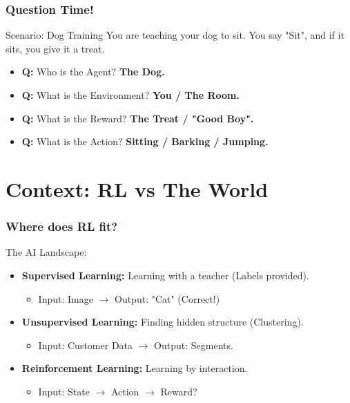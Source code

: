 \documentclass[aspectratio=169]{beamer}
\begin{document}
\begin{frame}
    \frametitle{Question Time!}
    \begin{alertblock}{Scenario: Dog Training}
        You are teaching your dog to sit. You say "Sit", and if it sits, you give it a treat.
    \end{alertblock}
    \pause
    \begin{itemize}
        \item \textbf{Q:} Who is the Agent? \pause \textbf{The Dog.}
        \item \textbf{Q:} What is the Environment? \pause \textbf{You / The Room.}
        \item \textbf{Q:} What is the Reward? \pause \textbf{The Treat / "Good Boy".}
        \item \textbf{Q:} What is the Action? \pause \textbf{Sitting / Barking / Jumping.}
    \end{itemize}
\end{frame}

\section{Context: RL vs The World}

\begin{frame}
    \frametitle{Where does RL fit?}
    The AI Landscape:
    \vspace{0.5cm}
    \begin{itemize}
        \item \textbf{Supervised Learning:} Learning with a teacher (Labels provided).
        \begin{itemize}
            \item Input: Image $\rightarrow$ Output: "Cat" (Correct!)
        \end{itemize}
        \item \textbf{Unsupervised Learning:} Finding hidden structure (Clustering).
        \begin{itemize}
            \item Input: Customer Data $\rightarrow$ Output: Segments.
        \end{itemize}
        \item \textbf{Reinforcement Learning:} Learning by interaction.
        \begin{itemize}
            \item Input: State $\rightarrow$ Action $\rightarrow$ Reward?
        \end{itemize}
    \end{itemize}
\end{frame}
\end{document}

